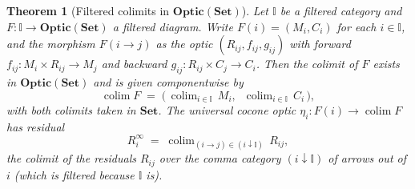 \documentclass[11pt,a4paper]{article}
\theoremstyle{plain}
\newtheorem{theorem}{Theorem}[section]
\theoremstyle{definition}
\theoremstyle{remark}
\newcommand{\Optic}{\mathbf{Optic}}
\newcommand{\colim}{\operatorname{colim}}
\begin{document}
\begin{theorem}[Filtered colimits in $\Optic(\mathbf{Set})$]
\label{thm:filtered-colimits-optic}
Let $\mathbb I$ be a filtered category and
$F:\mathbb I\to\Optic(\mathbf{Set})$ a filtered diagram. Write
$F(i)=(M_{i},C_{i})$ for each $i\in\mathbb I$, and the morphism
$F(i\to j)$ as the optic $(R_{ij},f_{ij},g_{ij})$ with forward
$f_{ij}:M_{i}\times R_{ij}\to M_{j}$ and backward
$g_{ij}:R_{ij}\times C_{j}\to C_{i}$. Then the colimit of $F$ exists in
$\Optic(\mathbf{Set})$ and is given componentwise by
\begin{equation}\label{eq:filtered-colim}
  \colim F \;=\; \bigl(\,\colim_{i\in\mathbb I}\,M_{i},\;\;
  \colim_{i\in\mathbb I}\,C_{i}\,\bigr),
\end{equation}
with both colimits taken in $\mathbf{Set}$. The universal cocone optic
$\eta_{i}:F(i)\to\colim F$ has residual
\begin{equation}\label{eq:residual-i}
  R_{i}^{\infty} \;=\; \colim_{(i\to j)\in(i\downarrow\mathbb I)}\,R_{ij},
\end{equation}
the colimit of the residuals $R_{ij}$ over the comma category
$(i\downarrow\mathbb I)$ of arrows out of $i$ (which is filtered
because $\mathbb I$ is).
\end{theorem}
\end{document}
